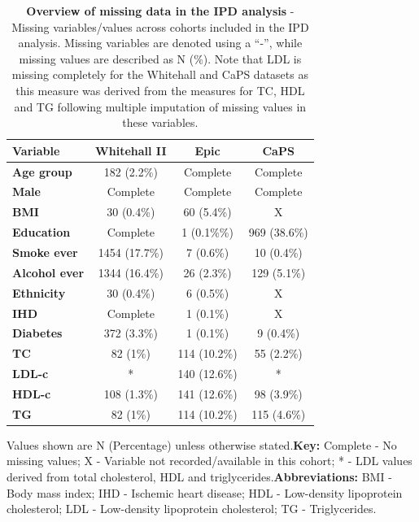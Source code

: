\documentclass[a4paper, twoside]{templates/ociamthesis}
\begin{document}
\begin{table}[H]

\caption[Overview of missing data in the IPD analysis]{\label{tab:missingMatrix-table}\textbf{Overview of missing data in the IPD analysis} - Missing variables/values across cohorts included in the IPD analysis. Missing variables are denoted using a ``-'', while missing values are described as N (\%). Note that LDL is missing completely for the Whitehall and CaPS datasets as this measure was derived from the measures for TC, HDL and TG following multiple imputation of missing values in these variables.}
\centering
\begin{threeparttable}
\begin{tabular}[t]{>{}lccc}
\toprule
\textbf{Variable} & \textbf{Whitehall II} & \textbf{Epic} & \textbf{CaPS}\\
\midrule
\textbf{Age group} & 182 (2.2\%) & Complete & Complete\\
\textbf{Male} & Complete & Complete & Complete\\
\textbf{BMI} & 30 (0.4\%) & 60 (5.4\%) & X\\
\textbf{Education} & Complete & 1 (0.1\%\%) & 969 (38.6\%)\\
\textbf{Smoke ever} & 1454 (17.7\%) & 7 (0.6\%) & 10 (0.4\%)\\
\textbf{Alcohol ever} & 1344 (16.4\%) & 26 (2.3\%) & 129 (5.1\%)\\
\textbf{Ethnicity} & 30 (0.4\%) & 6 (0.5\%) & X\\
\textbf{IHD} & Complete & 1 (0.1\%) & X\\
\textbf{Diabetes} & 372 (3.3\%) & 1 (0.1\%) & 9 (0.4\%)\\
\textbf{TC} & 82 (1\%) & 114 (10.2\%) & 55 (2.2\%)\\
\textbf{LDL-c} & * & 140 (12.6\%) & *\\
\textbf{HDL-c} & 108 (1.3\%) & 141 (12.6\%) & 98 (3.9\%)\\
\textbf{TG} & 82 (1\%) & 114 (10.2\%) & 115 (4.6\%)\\
\bottomrule
\end{tabular}
\begin{tablenotes}
\item Values shown are N (Percentage) unless otherwise stated.\newline \textbf{Key:} Complete - No missing values; X - Variable not recorded/available in this cohort; * - LDL values derived from total cholesterol, HDL and triglycerides.\newline \textbf{Abbreviations:} BMI - Body mass index; IHD - Ischemic heart disease; HDL - Low-density lipoprotein cholesterol; LDL - Low-density lipoprotein cholesterol; TG - Triglycerides.
\end{tablenotes}
\end{threeparttable}
\end{table}
\end{document}

